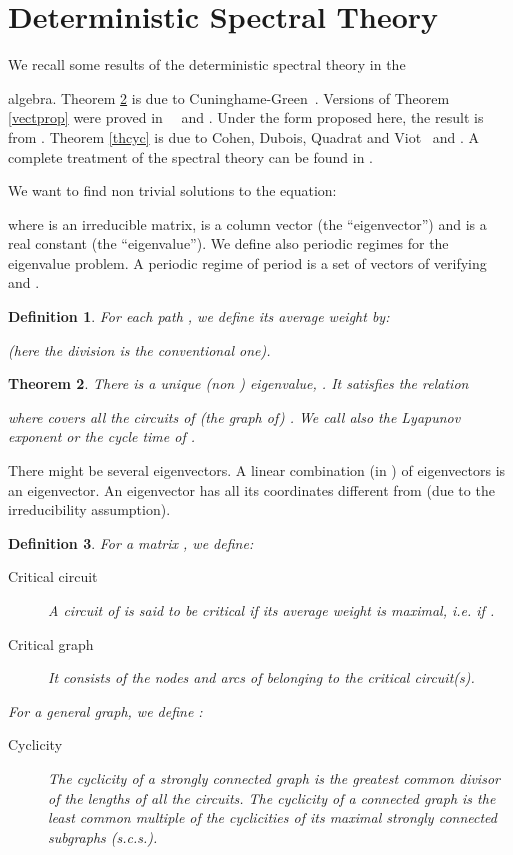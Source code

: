 \documentclass[11pt,titlepage]{article}
\newcommand{\parag}{\medskip\noindent}
\newtheorem{theo}{Theorem }[section]
\newtheorem{defi}[theo]{Definition }
\begin{document}
\section{Deterministic Spectral Theory}
\label{se:dst}
We recall some results of the deterministic spectral theory in the
 
algebra. Theorem \ref{lyap} is due to
Cuninghame-Green~\cite{cuni62}. Versions of Theorem
\ref{vectprop} were proved in~\cite{roma}~\cite{cuni79} and
\cite{GoMi77}. Under 
the form proposed here, the result is  
from \cite{CDQV85}.
Theorem \ref{thcyc} is due to Cohen, Dubois, Quadrat and
Viot~\cite{CDQV83} and \cite{CDQV85}. A complete
treatment of the spectral theory can be found in \cite{BCOQ}.


\parag
We want to find non trivial solutions to the equation:

where  is an irreducible matrix,  is a column vector
(the 
``eigenvector'') and  is a real constant (the ``eigenvalue''). We
define also periodic regimes for the eigenvalue 
problem. A periodic regime of period
  is a set of vectors  of
 verifying  and . 

\begin{defi}
For each path , we define its
average 
weight by:

(here the division is the conventional one).
\end{defi}

\begin{theo}
There is a unique (non ) eigenvalue, . It satisfies the relation

where  covers all the circuits of (the graph of) .
We call also  the Lyapunov exponent or the cycle time of .
\label{lyap}
\end{theo}

There might be several eigenvectors. A linear combination (in ) of
eigenvectors is an eigenvector. An eigenvector has all its coordinates different from
 (due to the irreducibility assumption). 

\begin{defi}
For a matrix , we define:
\begin{description}
\item [Critical circuit] A circuit  of  is said to be critical if its
average weight is maximal, i.e. if .
\item[Critical graph] It consists of the nodes and arcs of  belonging to the
critical circuit(s).
\end{description} 
For a general graph, we define :
\begin{description} 
\item [Cyclicity] The cyclicity of a strongly connected graph 
is the greatest common divisor of the lengths of all the circuits. The
cyclicity of 
a connected graph is the least common multiple of the cyclicities of its
maximal strongly connected 
subgraphs (s.c.s.).
\end{description}
\label{3def}
\end{defi}
\end{document}
